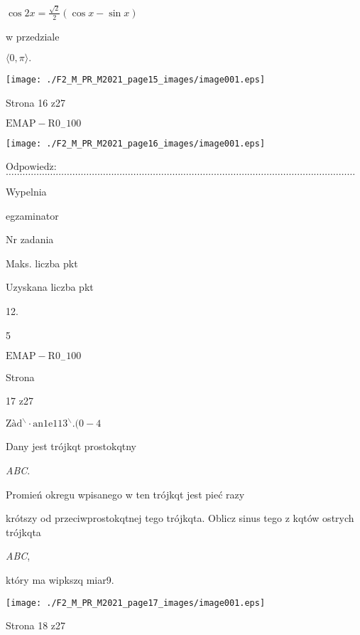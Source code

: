 \documentclass[a4paper,12pt]{article}
\begin{document}
$\cos 2x =\displaystyle \frac{\sqrt{2}}{2}(\cos x-\sin x)$

w przedziale

$\langle 0, \pi\rangle.$
\begin{center}
\texttt{[image: ./F2\_M\_PR\_M2021\_page15\_images/image001.eps]}
\end{center}
Strona 16 z27

$\mathrm{E}\mathrm{M}\mathrm{A}\mathrm{P}-\mathrm{R}0_{-}100$




\begin{center}
\texttt{[image: ./F2\_M\_PR\_M2021\_page16\_images/image001.eps]}
\end{center}
$\mathrm{O}\mathrm{d}\mathrm{p}\mathrm{o}\mathrm{w}\mathrm{i}\mathrm{e}\mathrm{d}\acute{\mathrm{z}}$:$\ldots\ldots\ldots\ldots\ldots\ldots\ldots\ldots\ldots\ldots\ldots\ldots\ldots\ldots\ldots\ldots\ldots\ldots\ldots\ldots\ldots\ldots\ldots\ldots\ldots\ldots\ldots\ldots\ldots\ldots\ldots\ldots\ldots\ldots\ldots\ldots\ldots\ldots\ldots\ldots\ldots\ldots$

Wypelnia

egzaminator

Nr zadania

Maks. liczba pkt

Uzyskana liczba pkt

12.

5

$\mathrm{E}\mathrm{M}\mathrm{A}\mathrm{P}-\mathrm{R}0_{-}100$

Strona

17 z27





$\mathrm{Z}\text{à} \mathrm{d}^{\backslash }\cdot \mathrm{a}\mathrm{n}1\mathrm{e}1 13^{\backslash }. (0-4$

Dany jest trójkqt prostokqtny

{\it ABC}.

Promień okregu wpisanego w ten trójkqt jest pieć razy

krótszy od przeciwprostokqtnej tego trójkqta. Oblicz sinus tego z kqtów ostrych trójkqta

{\it ABC},

który ma wipkszq miar9.
\begin{center}
\texttt{[image: ./F2\_M\_PR\_M2021\_page17\_images/image001.eps]}
\end{center}
Strona 18 z27
\end{document}

